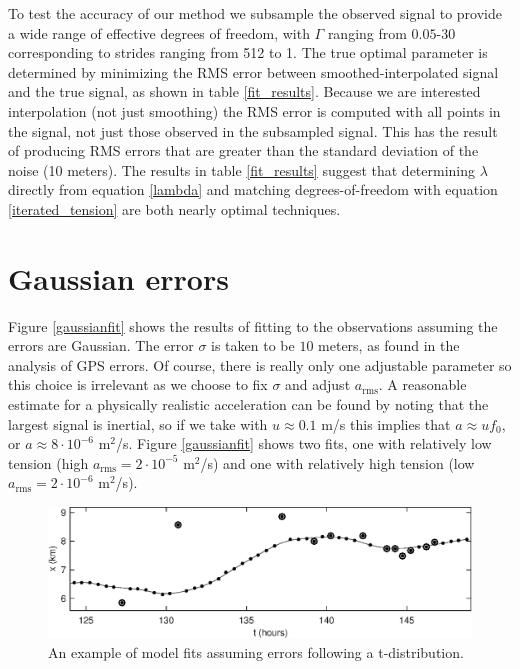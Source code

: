 \documentclass[twocol]{ametsoc}
\begin{document}
To test the accuracy of our method we subsample the observed signal to provide a wide range of effective degrees of freedom, with $\Gamma$ ranging from $0.05$-$30$ corresponding to strides ranging from 512 to 1. The true optimal parameter is determined by minimizing the RMS error between smoothed-interpolated signal and the true signal, as shown in table \ref{fit_results}. Because we are interested interpolation (not just smoothing) the RMS error is computed with all points in the signal, not just those observed in the subsampled signal. This has the result of producing RMS errors that are greater than the standard deviation of the noise (10 meters). The results in table \ref{fit_results} suggest that determining $\lambda$ directly from equation \ref{lambda} and matching degrees-of-freedom with equation \ref{iterated_tension} are both nearly optimal techniques.

\section{Gaussian errors}

Figure \ref{gaussianfit} shows the results of fitting to the observations assuming the errors are Gaussian. The error $\sigma$ is taken to be $10$ meters, as found in the analysis of GPS errors. Of course, there is really only one adjustable parameter so this choice is  irrelevant as we choose to fix $\sigma$ and adjust $a_{\textrm{rms}}$.  A reasonable estimate for a physically realistic acceleration can be found by noting that the largest signal is inertial, so if we take with $u \approx 0.1$ m/s this implies  that $a \approx u f_0$, or $a \approx 8 \cdot 10^{-6}$ m$^2$/s. Figure \ref{gaussianfit} shows two fits, one with relatively low tension (high $a_{\textrm{rms}}=2 \cdot 10^{-5}$ m$^2$/s) and one with relatively high tension (low $a_{\textrm{rms}}=2 \cdot 10^{-6}$ m$^2$/s).
\begin{figure}[t]
  \centerline{\includegraphics[width=39pc,angle=0]{tdistributionfit}}
  
  \caption{An example of model fits assuming errors following a t-distribution.}
  \label{tdistributionfit}
\end{figure}
\end{document}
